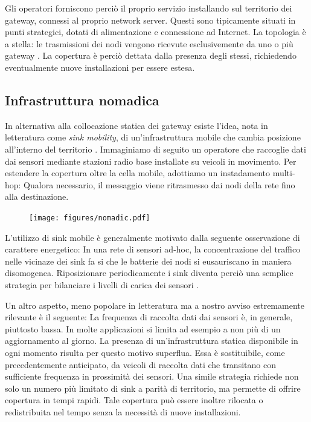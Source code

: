 \documentclass[a4paper,12pt]{article}
\theoremstyle{definition}
\begin{document}

Gli operatori forniscono perciò il proprio servizio installando sul territorio dei gateway, connessi al proprio network server. Questi sono tipicamente situati in punti strategici, dotati di alimentazione e connessione ad Internet. La topologia è a stella: le trasmissioni dei nodi vengono ricevute esclusivemente da uno o più gateway \cite{loraspec}. La copertura è perciò dettata dalla presenza degli stessi, richiedendo eventualmente nuove installazioni per essere estesa.

\subsection{Infrastruttura nomadica}

In alternativa alla collocazione statica dei gateway esiste l'idea, nota in letteratura come \emph{sink mobility}, di un'infrastruttura mobile che cambia posizione all'interno del territorio \cite{sinkmob}. Immaginiamo di seguito un operatore che raccoglie dati dai sensori mediante stazioni radio base installate su veicoli in movimento. Per estendere la copertura oltre la cella mobile, adottiamo un instadamento multi-hop: Qualora necessario, il messaggio viene ritrasmesso dai nodi della rete fino alla destinazione.

\begin{figure}[H]
\centering
\texttt{[image: figures/nomadic.pdf]}
\caption{}
\end{figure}

L'utilizzo di sink mobile è generalmente motivato dalla seguente osservazione di carattere energetico: In una rete di sensori ad-hoc, la concentrazione del traffico nelle vicinaze dei sink fa si che le batterie dei nodi si eusauriscano in maniera disomogenea. Riposizionare periodicamente i sink diventa perciò una semplice strategia per bilanciare i livelli di carica dei sensori \cite{moblife1, moblife2}.

Un altro aspetto, meno popolare in letteratura ma a nostro avviso estremamente rilevante è il seguente: La frequenza di raccolta dati dai sensori è, in generale, piuttosto bassa. In molte applicazioni si limita ad esempio a non più di un aggiornamento al giorno. La presenza di un'infrastruttura statica disponibile in ogni momento risulta per questo motivo superflua. Essa è sostituibile, come precedentemente anticipato, da veicoli di raccolta dati che transitano con sufficiente frequenza in prossimità dei sensori. Una simile strategia richiede non solo un numero più limitato di sink a parità di territorio, ma permette di offrire copertura in tempi rapidi. Tale copertura può essere inoltre rilocata o redistribuita nel tempo senza la necessità di nuove installazioni.
\end{document}
